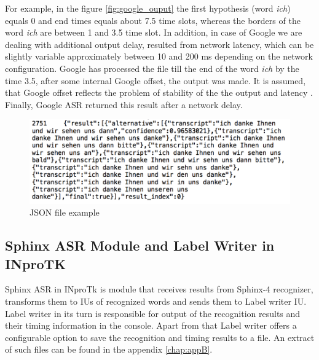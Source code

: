 For example, in the figure  \ref {fig:google_ouput} the first hypothesis (word
\textit {ich}) equals 0 and end times equals about 7.5 time slots, whereas the
borders of the word \textit {ich} are between 1 and 3.5 time slot. In addition,
in case of Google we are dealing with additional output delay, resulted from network latency, which can be slightly variable approximately
between 10 and 200 ms depending on the network configuration. Google has
processed the file till the end of the word \textit {ich} by the time 3.5,
after some internal Google offset, the output was made.
It is assumed, that Google offset reflects the problem of stability of the
the output and latency \parencite {mcgrawgrauenstein2012}. Finally, Google ASR returned this result after 
a network delay.  
 \begin{figure}[htbp]
  \centering
   \includegraphics[width=1\textwidth]{images/json_extr.png}
    \caption{JSON file example}
      \label{fig:json_ouput}
\end{figure}
\subsection {Sphinx ASR Module and Label Writer in INproTK}
Sphinx ASR in INproTk is module that receives results from Sphinx-4
recognizer, transforms them to IUs of recognized words and sends them
to Label writer IU.   Label writer in its turn
is responsible for output of the recognition results and  their timing
information in the console. Apart from that Label writer  offers a configurable
option to save the recognition and timing results to a file. An extract of such
files can be found in the appendix \ref{chap:appB}. 

